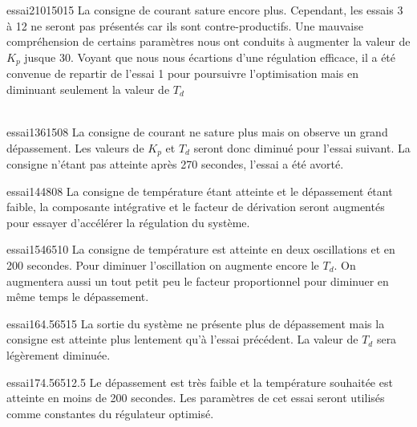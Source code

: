 \begin{optibox}{essai2}{10}{150}{15}
La consigne de courant sature encore plus.
Cependant, les essais 3 à 12 ne seront pas présentés car ils sont contre-productifs. Une mauvaise compréhension de certains paramètres nous ont conduits à augmenter la valeur de $K_{p}$ jusque 30. Voyant que nous nous écartions d'une régulation efficace, il a été convenue de repartir de l'essai 1 pour poursuivre l'optimisation mais en diminuant seulement la valeur de $T_{d}$\\
\\\hline
\end{optibox}

\begin{optibox}{essai13}{6}{150}{8}
La consigne de courant ne sature plus mais on observe un grand dépassement. Les valeurs de $K_{p}$ et $T_{d}$ seront donc diminué pour l'essai suivant. La consigne n'étant pas atteinte après 270 secondes, l'essai a été avorté. 
\\\hline
\end{optibox}

\begin{optibox}{essai14}{4}{80}{8}
La consigne de température étant atteinte et le dépassement étant faible, la composante intégrative et le facteur de dérivation seront augmentés pour essayer d'accélérer la régulation du système.
 \\\hline
\end{optibox}

\begin{optibox}{essai15}{4}{65}{10}
La consigne de température est atteinte en deux oscillations et en 200 secondes. Pour diminuer l'oscillation on augmente encore le  $T_{d}$. On augmentera aussi un tout petit peu le facteur proportionnel pour diminuer en même temps le dépassement.\\\hline
\end{optibox}

\begin{optibox}{essai16}{4.5}{65}{15}
La sortie du système ne présente plus de dépassement mais la consigne est atteinte plus lentement qu'à l'essai précédent. La valeur de $T_{d}$ sera légèrement diminuée.
\\\hline
\end{optibox}

\begin{optibox}{essai17}{4.5}{65}{12.5}
Le dépassement est très faible et la température souhaitée est atteinte en moins de 200 secondes. 
Les paramètres de cet essai seront utilisés comme constantes du régulateur optimisé.
\\\hline
\end{optibox}


